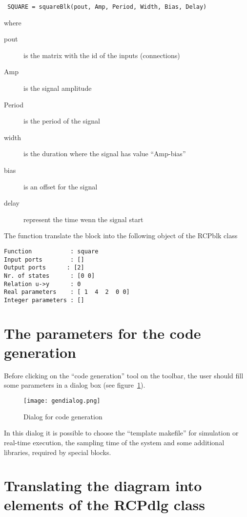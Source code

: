  \begin{verbatim}
 SQUARE = squareBlk(pout, Amp, Period, Width, Bias, Delay)
 \end{verbatim}
 
 where
 
 \begin{description}
 \item[pout] is the matrix with the id of the inputs (connections)
 \item [Amp] is the signal amplitude
 \item [Period] is the period of the signal
 \item [width] is the duration where the signal has value ``Amp-bias''
 \item [bias] is an offset for the signal
 \item [delay] represent the time wenn the signal start
 \end{description}
 
 The function translate the block into the following object of the RCPblk class
 
 \begin{verbatim}
Function           : square
Input ports        : []
Output ports      : [2]
Nr. of states      : [0 0]
Relation u->y      : 0
Real parameters    : [ 1  4  2  0 0]
Integer parameters : []
\end{verbatim}

\section{The parameters for the code generation}

Before clicking on the ``code generation'' tool on the toolbar, the user should fill some parameters in a dialog box (see figure~\ref{codedlg}).

 \begin{figure}[htbp]	%
 \centering
 \texttt{[image: gendialog.png]}
 \caption{Dialog for code generation}
 \label{codedlg}
 \end{figure}

In this dialog it is possible to choose the ``template makefile'' for 
simulation or real-time execution, the sampling time of the system and some 
additional libraries, required by special blocks.

\section{Translating the diagram into elements of the RCPdlg class}
\label{Sect-IO}

